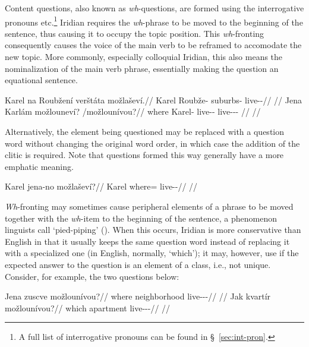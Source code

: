 Content questions, also known as \emph{wh}-questions, are formed using the
interrogative pronouns   
etc.\footnote{ A full list of interrogative pronouns can be found in
\S~\ref{sec:int-pron}. } Iridian requires the \emph{wh}-phrase to be moved to
the beginning of the sentence, thus causing it to occupy the topic position.
This \emph{wh}-fronting consequently
causes the voice of the main verb to be reframed to accomodate the new topic.
More commonly, especially colloquial Iridian, this
also means the nominalization of the main verb phrase,
essentially making the question an equational sentence.

\pex
\a\begingl
\gla Karel na Roubžení verštáta možlaševí.//
\glb Karel \Loc{} Roubže-\Gen{} suburbs-\Acc{} live-\Av{}-\Cont{}//
\glft {}//
\endgl
\a\begingl
\gla Jena Karlám možlouneví? /možlounívou?//
\glb where Karel-\Agt{} live-\Lv{}-\Cont{} live-\Lv{}-\Cont{}-\Nz{} //
\glft {}//
\endgl
\xe

Alternatively, the element being questioned may be replaced with a question word
without changing the original word order, in which case the addition of the
clitic  is required. Note that questions formed this way generally have
a more emphatic meaning.

\pex
\begingl
\gla Karel jena-no možlaševí?//
\glb Karel where=\Q{} live-\Av{}-\Cont{}//
\glft {}//
\endgl
\xe


\emph{Wh}-fronting may sometimes cause peripheral elements of a phrase to be
moved together with the \emph{wh}-item to the beginning of the sentence, a
phenomenon linguists call `pied-piping' (\cite[263-4]{ross1967}). When this
occurs, Iridian is more conservative than English in that it usually keeps the
same question word instead of replacing it with a specialized one (in English,
normally, `which'); it may, however, use  if the expected
answer to the question is an element of a class, i.e., not unique. Consider, for
example, the two questions below:

\pex
\a
\begingl
\gla Jena zuscve možlounívou?//
\glb where neighborhood live-\Lv{}-\Cont{}-\Nz{}//
\glft {}//
\endgl
\a
\begingl
\gla Jak kvartír možlounívou?//
\glb which apartment live-\Lv{}-\Cont{}-\Nz{}//
\glft {}//
\endgl
\xe

